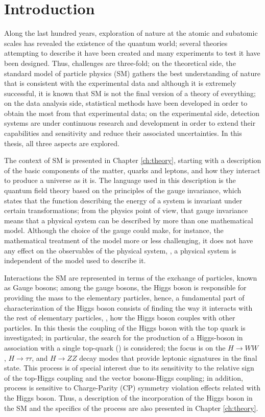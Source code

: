 \chapter{Introduction}
\label{ch:intro}

Along the last hundred years, exploration of nature at the atomic and subatomic scales has revealed the existence of the quantum world; several theories attempting to describe it have been created and many experiments to test it have been designed. Thus, challenges are three-fold; on the theoretical side, the standard model of particle physics (SM) gathers the best understanding of nature that is consistent with the experimental data and although it is extremely successful, it is known that SM is not the final version of a theory of everything; on the data analysis side, statistical methods have been developed in order to obtain the most from that experimental data; on the experimental side, detection systems are under continuous research and development in order to extend their capabilities and sensitivity and reduce their associated uncertainties. In this thesis, all three aspects are explored. 

The context of SM is presented in Chapter \ref{ch:theory}, starting with a description of the basic components of the matter, quarks and leptons, and how they interact to produce a universe as it is. The language used in this description is the quantum field theory based on the principles of the gauge invariance, which states that the function describing the energy of a system is invariant under certain transformations; from the physics point of view, that gauge invariance means that a physical system can be described by more than one mathematical model. Although the choice of the gauge could make, for instance, the mathematical treatment of the model more or less challenging, it does not have any effect on the observables of the physical system, \ie, a physical system is independent of the model used to describe it.

Interactions the SM are represented in terms of the exchange of particles, known as Gauge bosons; among the gauge bosons, the Higgs boson is responsible for providing the mass to the elementary particles, hence, a fundamental part of characterization of the Higgs boson consists of finding the way it interacts with the rest of elementary particles, \ie, how the Higgs boson couples with other particles. In this thesis the coupling of the Higgs boson with the top quark is investigated; in particular, the search for the production of a Higgs-boson in association with a single top-quark (\tH) is considered; the focus is on the $H \to WW$ , $H \to \tau\tau$, and $H \to ZZ$ decay modes that provide leptonic signatures in the final state. This process is of special interest due to its sensitivity to the relative sign of the top-Higgs coupling and the vector bosons-Higgs coupling; in addition, \tH process is sensitive to Charge-Parity (CP) symmetry violation effects related with the Higgs boson. Thus, a description of the incorporation of the Higgs boson in the SM and the specifics of the \tH process are also presented in Chapter \ref{ch:theory}.               

